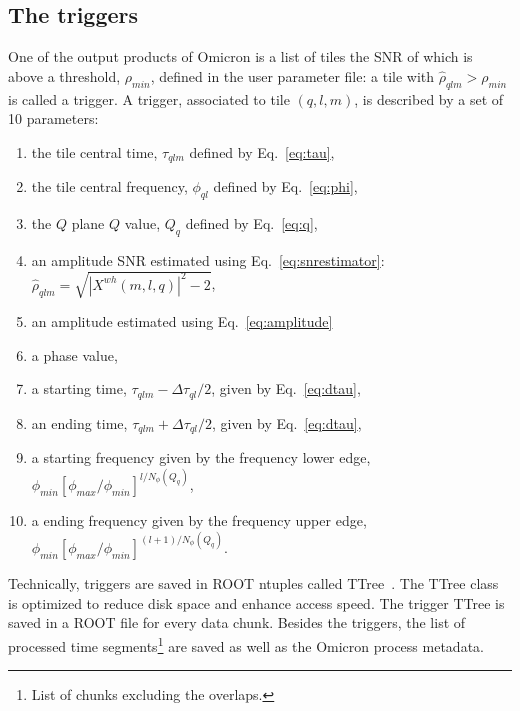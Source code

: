\subsection{The triggers} \label{sec:algorithm:triggering}
One of the output products of Omicron is a list of tiles the SNR of which is above a threshold, $\rho_{min}$, defined in the user parameter file: a tile with $\hat{\rho}_{qlm} > \rho_{min}$ is called a trigger. A trigger, associated to tile $(q,l,m)$, is described by a set of 10 parameters:
\begin{enumerate}
  \item the tile central time, $\tau_{qlm}$ defined by Eq.~\ref{eq:tau},
  \item the tile central frequency, $\phi_{ql}$ defined by Eq.~\ref{eq:phi},
  \item the $Q$ plane $Q$ value, $Q_{q}$ defined by Eq.~\ref{eq:q},
  \item an amplitude SNR estimated using Eq.~\ref{eq:snrestimator}: $\hat{\rho}_{qlm} = \sqrt{ |X^{wh}(m,l,q)|^2-2}$,
  \item an amplitude estimated using Eq.~\ref{eq:amplitude}
  \item a phase value, 
  \item a starting time, $\tau_{qlm} - \Delta \tau_{ql}/2$, given by Eq.~\ref{eq:dtau},
  \item an ending time, $\tau_{qlm} +\Delta \tau_{ql}/2$, given by Eq.~\ref{eq:dtau},
  \item a starting frequency given by the frequency lower edge, $\phi_{min}[\phi_{max}/\phi_{min}]^{l/N_{\phi}(Q_q)}$,
  \item a ending frequency given by the frequency upper edge, $\phi_{min}[\phi_{max}/\phi_{min}]^{(l+1)/N_{\phi}(Q_q)}$.
\end{enumerate}
Technically, triggers are saved in ROOT ntuples called TTree~\cite{Brun:1997pa}. The TTree class is optimized to reduce disk space and enhance access speed. The trigger TTree is saved in a ROOT file for every data chunk. Besides the triggers, the list of processed time segments\footnote{List of chunks excluding the overlaps.} are saved as well as the Omicron process metadata.
